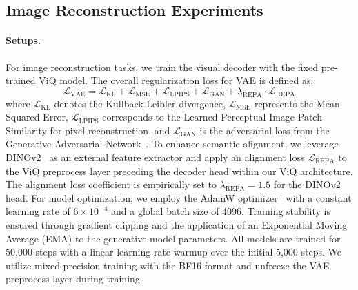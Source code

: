 \subsection{Image Reconstruction Experiments}
\paragraph{Setups.} For image reconstruction tasks, we train the visual decoder with the fixed pre-trained ViQ model. The overall regularization loss for VAE is defined as:
\begin{equation}
    \mathcal{L}_{\text{VAE}} = \mathcal{L}_{\text{KL}} + \mathcal{L}_{\text{MSE}} + \mathcal{L}_{\text{LPIPS}} + \mathcal{L}_{\text{GAN}} + \lambda_{\text{REPA}} \cdot \mathcal{L}_{\text{REPA}}
\end{equation}
where $\mathcal{L}_{\text{KL}}$ denotes the Kullback-Leibler divergence, $\mathcal{L}_{\text{MSE}}$ represents the Mean Squared Error, $\mathcal{L}_{\text{LPIPS}}$ corresponds to the Learned Perceptual Image Patch Similarity for pixel reconstruction, and $\mathcal{L}_{\text{GAN}}$ is the adversarial loss from the Generative Adversarial Network~\cite{goodfellow2020generative}. To enhance semantic alignment, we leverage DINOv2~\cite{oquab2023dinov2} as an external feature extractor and apply an alignment loss $\mathcal{L}_{\text{REPA}}$ to the ViQ preprocess layer preceding the decoder head within our ViQ architecture. The alignment loss coefficient is empirically set to $\lambda_{\text{REPA}} = 1.5$ for the DINOv2 head.
For model optimization, we employ the AdamW optimizer~\cite{loshchilov2017decoupled, kingma2017adammethodstochasticoptimization} with a constant learning rate of $6\times10^{-4}$ and a global batch size of 4096. Training stability is ensured through gradient clipping and the application of an Exponential Moving Average (EMA) to the generative model parameters. All models are trained for 50,000 steps with a linear learning rate warmup over the initial 5,000 steps. We utilize mixed-precision training with the BF16 format and unfreeze the VAE preprocess layer during training.


